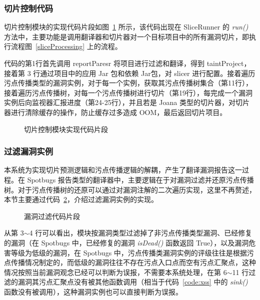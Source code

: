 \subsubsection{切片控制代码}

切片控制模块的实现代码片段如图~\ref{code:sliceControl} 所示，该代码出现在 SliceRunner 的 \textit{run()} 方法中，主要功能是调用翻译器和切片器对一个目标项目中的所有漏洞切片，即执行流程图~\ref{sliceProcessing} 上的流程。

代码的第1行首先调用 reportParesr 将项目进行过滤和翻译，得到 taintProject， 接着第 3 行通过项目中的应用 Jar 包和依赖 Jar包，对 slicer 进行配置。接着遍历污点传播类型的漏洞实例，对于每一个实例，获取其污点传播树集合（第11行），接着遍历污点传播树，对每一个污点传播树进行切片（第19行），每完成一个漏洞实例后向监视器汇报进度（第24-25行），并且若是 Joana 类型的切片器，对切片器进行清除缓存的操作，防止缓存过多造成 OOM，最后返回切片项目。

\begin{figure}[!htbp]
    \centering
    \begin{minipage}[!htbp]{0.9\textwidth}
        
    \end{minipage}
    \caption{切片控制模块实现代码片段}\label{code:sliceControl}
\end{figure}

\subsubsection{过滤漏洞实例}

本系统为实现切片预测逻辑和污点传播逻辑的解耦，产生了翻译漏洞报告这一过程。在 Spotbugs 报告类型的翻译器中，主要逻辑在于对漏洞过滤并还原污点传播树。对于污点传播树的还原可以通过对漏洞注解的二次遍历实现，这里不再赘述，本节主要通过代码~\ref{code:sliceFilter}，介绍过滤漏洞实例的实现。

\begin{figure}[!htbp]
    \centering
    \begin{minipage}[!htbp]{0.9\textwidth}
        
    \end{minipage}
    \caption{漏洞过滤代码片段}\label{code:sliceFilter}
\end{figure}

从第 3$\sim$4 行可以看出，模块按漏洞类型过滤掉了非污点传播类型漏洞、已经修复的漏洞（在 Spotbugs 中，已经修复的漏洞 \textit{isDead()} 函数返回 True），以及漏洞危害等级为低级的漏洞，在 Spotbugs 中，污点传播类漏洞实例的评级往往是根据污点传播情况制定的，而低级的漏洞往往不存在污点入口点而空有污点汇聚点，这种情况按照当前漏洞观念已经可以判断为误报，不需要本系统处理，在第 6$\sim$11 行过滤的漏洞其污点汇聚点没有被其他函数调用（相当于代码~\ref{code:xss} 中的 \textit{sink()} 函数没有被调用），这种漏洞实例也可以直接判断为误报。


